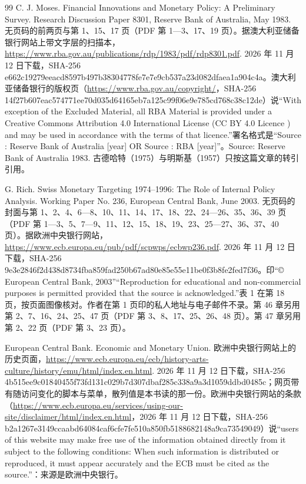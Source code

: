 \begin{thebibliography}{99}
 C. J. Moses. Financial Innovations and Monetary Policy: A Preliminary Survey. Research Discussion Paper 8301, Reserve Bank of Australia, May 1983. 无页码的前两页与第 1、15、17 页（PDF 第 1—3、17、19 页）。据澳大利亚储备银行网站上带文字层的扫描本，\url{https://www.rba.gov.au/publications/rdp/1983/pdf/rdp8301.pdf}. 2026 年 11 月 12 日下载，SHA-256 e662c19279eeacd8597b497b38304778fe7e7e9cb537a23d082dfaea1a904c4a。澳大利亚储备银行的版权页（\url{https://www.rba.gov.au/copyright/}，SHA-256 14f27b607eac574771ee70d035d64165eb7a125c99f06e9e785cd768c38c12de）说“With exception of the Excluded Material, all RBA Material is provided under a Creative Commons Attribution 4.0 International License (CC BY 4.0 Licence ) and may be used in accordance with the terms of that licence.”署名格式是“Source : Reserve Bank of Australia [year] OR Source : RBA [year]”。Source: Reserve Bank of Australia 1983. 古德哈特（1975）与明斯基（1957）只按这篇文章的转引引用。

 G. Rich. Swiss Monetary Targeting 1974--1996: The Role of Internal Policy Analysis. Working Paper No. 236, European Central Bank, June 2003. 无页码的封面与第 1、2、4、6—8、10、11、14、17、18、22、24—26、35、36、39 页（PDF 第 1—3、5、7—9、11、12、15、18、19、23、25—27、36、37、40 页）。据欧洲中央银行网站，\url{https://www.ecb.europa.eu/pub/pdf/scpwps/ecbwp236.pdf}. 2026 年 11 月 12 日下载，SHA-256 9e3e2846f2d438d8734fba859fad250b67ad80e85e55e11be0f3b8fe2fed7f36。印“© European Central Bank, 2003”“Reproduction for educational and non-commercial purposes is permitted provided that the source is acknowledged.”表 1 在第 18 页，按页面图像核对。作者在第 1 页印的私人地址与电子邮件不录。第 46 章另用第 2、7、16、24、25、47 页（PDF 第 3、8、17、25、26、48 页）。第 47 章另用第 2、22 页（PDF 第 3、23 页）。

 European Central Bank. Economic and Monetary Union. 欧洲中央银行网站上的历史页面，\url{https://www.ecb.europa.eu/ecb/history-arts-culture/history/emu/html/index.en.html}. 2026 年 11 月 12 日下载，SHA-256 4b515ee9c01840455f73fd131c029b7d307dbaf285c338a9a3d1059ddbd0485c；网页带有随访问变化的脚本与菜单，散列值是本书读的那一份。欧洲中央银行网站的条款（\url{https://www.ecb.europa.eu/services/using-our-site/disclaimer/html/index.en.html}，2026 年 11 月 12 日下载，SHA-256 b2a1267e3149ccaabd64084caf6cfe7fe510a850fb5188682148a9ca73549049）说“users of this website may make free use of the information obtained directly from it subject to the following conditions: When such information is distributed or reproduced, it must appear accurately and the ECB must be cited as the source.”：来源是欧洲中央银行。


\end{thebibliography}
